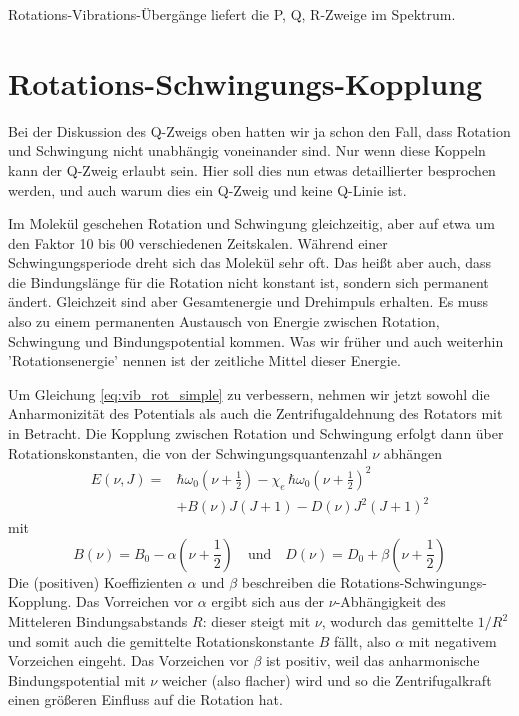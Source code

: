 \begin{marginfigure}
\caption{Rotations-Vibrations-Übergänge liefert die P, Q, R-Zweige im Spektrum.}
\end{marginfigure}
 
 
\section{Rotations-Schwingungs-Kopplung}

Bei der Diskussion des Q-Zweigs oben hatten wir ja schon den Fall, dass Rotation und Schwingung nicht unabhängig voneinander sind. Nur wenn diese Koppeln kann der Q-Zweig erlaubt sein. Hier soll dies nun etwas detaillierter besprochen werden, und auch warum dies ein Q-Zweig und keine Q-Linie ist.

Im Molekül geschehen Rotation und Schwingung gleichzeitig, aber auf etwa um den Faktor 10 bis 00 verschiedenen Zeitskalen. Während einer Schwingungsperiode dreht sich das Molekül sehr oft. Das heißt aber auch, dass die Bindungslänge für die Rotation nicht konstant ist, sondern sich permanent ändert. Gleichzeit sind aber Gesamtenergie und Drehimpuls erhalten. Es muss also zu einem permanenten Austausch von Energie zwischen Rotation, Schwingung und Bindungspotential kommen. Was wir früher und auch weiterhin 'Rotationsenergie' nennen ist der zeitliche Mittel dieser Energie.

Um Gleichung \ref{eq:vib_rot_simple} zu verbessern, nehmen wir jetzt sowohl die Anharmonizität des Potentials als auch die Zentrifugaldehnung des Rotators mit in Betracht. Die Kopplung zwischen Rotation und Schwingung erfolgt dann über Rotationskonstanten, die von der Schwingungsquantenzahl $\nu$ abhängen
\begin{align}
 E(\nu, J) = & \hbar \omega_0 \left( \nu  + \frac{1}{2} \right)
 - \chi_e \, \hbar \omega_0  \left( \nu  + \frac{1}{2} \right)^2 \\
 & + B(\nu) J (J+1) - D(\nu) J^2 (J+1)^2  \nonumber
\end{align}
mit
\begin{equation}
B(\nu) = B_0 - \alpha \left(\nu + \frac{1}{2} \right) \quad \text{und} \quad
D(\nu) = D_0 + \beta \left(\nu + \frac{1}{2} \right) 
\end{equation}
Die (positiven) Koeffizienten $\alpha$ und $\beta$ beschreiben die  Rotations-Schwingungs-Kopplung. Das Vorreichen vor $\alpha$ ergibt sich aus der $\nu$-Abhängigkeit des Mitteleren Bindungsabstands $R$: dieser steigt mit $\nu$, wodurch das gemittelte $1/R^2$ und somit auch die gemittelte Rotationskonstante $B$ fällt, also $\alpha$ mit negativem Vorzeichen eingeht. Das Vorzeichen vor $\beta$ ist positiv, weil das anharmonische Bindungspotential mit $\nu$ weicher (also flacher) wird und so die Zentrifugalkraft einen größeren Einfluss auf die Rotation hat.


